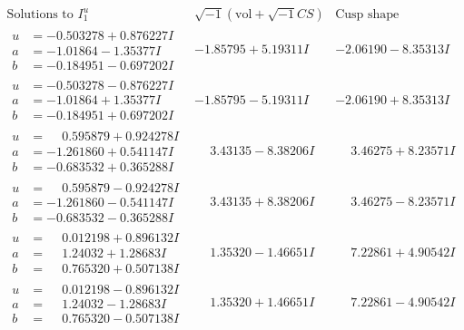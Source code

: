 \documentclass[1p]{elsarticle_modified}
\theoremstyle{definition}
\newcommand{\I}{\sqrt{-1}}
\begin{document}
$$\begin{array}{c|c|c}  
\text{Solutions to }I^u_{1}& \I (\text{vol} + \sqrt{-1}CS) & \text{Cusp shape}\\
 \hline 
\begin{aligned}
u &= -0.503278 + 0.876227 I \\
a &= -1.01864 - 1.35377 I \\
b &= -0.184951 - 0.697202 I\end{aligned}
 & -1.85795 + 5.19311 I & -2.06190 - 8.35313 I \\ \hline\begin{aligned}
u &= -0.503278 - 0.876227 I \\
a &= -1.01864 + 1.35377 I \\
b &= -0.184951 + 0.697202 I\end{aligned}
 & -1.85795 - 5.19311 I & -2.06190 + 8.35313 I \\ \hline\begin{aligned}
u &= \phantom{-}0.595879 + 0.924278 I \\
a &= -1.261860 + 0.541147 I \\
b &= -0.683532 + 0.365288 I\end{aligned}
 & \phantom{-}3.43135 - 8.38206 I & \phantom{-}3.46275 + 8.23571 I \\ \hline\begin{aligned}
u &= \phantom{-}0.595879 - 0.924278 I \\
a &= -1.261860 - 0.541147 I \\
b &= -0.683532 - 0.365288 I\end{aligned}
 & \phantom{-}3.43135 + 8.38206 I & \phantom{-}3.46275 - 8.23571 I \\ \hline\begin{aligned}
u &= \phantom{-}0.012198 + 0.896132 I \\
a &= \phantom{-}1.24032 + 1.28683 I \\
b &= \phantom{-}0.765320 + 0.507138 I\end{aligned}
 & \phantom{-}1.35320 - 1.46651 I & \phantom{-}7.22861 + 4.90542 I \\ \hline\begin{aligned}
u &= \phantom{-}0.012198 - 0.896132 I \\
a &= \phantom{-}1.24032 - 1.28683 I \\
b &= \phantom{-}0.765320 - 0.507138 I\end{aligned}
 & \phantom{-}1.35320 + 1.46651 I & \phantom{-}7.22861 - 4.90542 I \\ \hline\begin{aligned}

\end{aligned}
\end{array}$$
\end{document}
